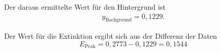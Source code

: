 Der daraus ermittelte Wert für den Hintergrund ist
\begin{align*}
    y_{\mathrm{Background}} = 0,1229.
\end{align*}

Der Wert für die Extinktion ergibt sich aus der Differenz der Daten 
\begin{equation}
    E_{\mathrm{Peak}} = 0,2773 - 0,1229 = 0,1544
\end{equation}


